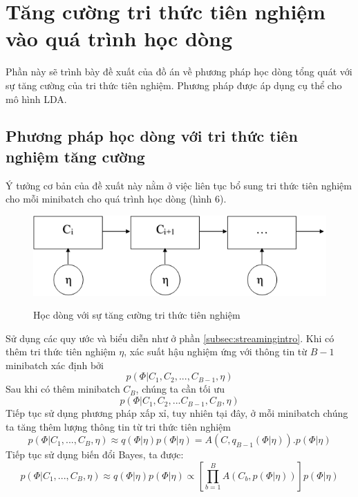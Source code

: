 \documentclass[fontsize=13pt]{scrartcl}
\begin{document}
\newpage
\section{Tăng cường tri thức tiên nghiệm vào quá trình học dòng}
Phần này sẽ trình bày đề xuất của đồ án về phương pháp học dòng tổng quát với sự tăng cường của tri thức tiên nghiệm. Phương pháp được áp dụng cụ thể cho mô hình LDA.
\subsection{Phương pháp học dòng với tri thức tiên nghiệm tăng cường}
Ý tưởng cơ bản của đề xuất này nằm ở việc liên tục bổ sung tri thức tiên nghiệm cho mỗi minibatch cho quá trình học dòng (hình 6).
\begin{figure}[h]
\begin{center}
\includegraphics[scale=.7]{img/streamingprior.png}
\label{fig:streamingprior}

\end{center}
\caption{Học dòng với sự tăng cường tri thức tiên nghiệm}

\end{figure}
Sử dụng các quy ước và biểu diễn như ở phần \ref{subsec:streamingintro}. Khi có thêm tri thức tiên nghiệm $\eta$, xác suất hậu nghiệm ứng với thông tin từ $B-1$ minibatch xác định bởi
\begin{equation}
p(\Phi | C_1, C_2, ...,C_{B-1},\eta)
\end{equation}
Sau khi có thêm minibatch $C_B$, chúng ta cần tối ưu
\begin{equation}
p(\Phi | C_1,C_2,...C_{B-1},C_{B},\eta)
\end{equation}
Tiếp tục sử dụng phương pháp xấp xỉ, tuy nhiên tại đây, ở mỗi minibatch chúng ta tăng thêm lượng thông tin từ tri thức tiên nghiệm
\begin{equation}
p(\Phi | C_1,...,C_B,\eta) \approx q(\Phi | \eta)p(\Phi | \eta) = A(C,q_{B-1}(\Phi | \eta)).p(\Phi | \eta)
\end{equation}
Tiếp tục sử dụng biến đổi Bayes, ta được:
\begin{equation}\label{eq:newstreaminggupdate2}
p(\Phi | C_1,...,C_B,\eta) \approx q(\Phi | \eta) p(\Phi | \eta) \propto [\prod_{b=1}^{B} A(C_b,p(\Phi | \eta))] p(\Phi | \eta)
\end{equation}
\end{document}
